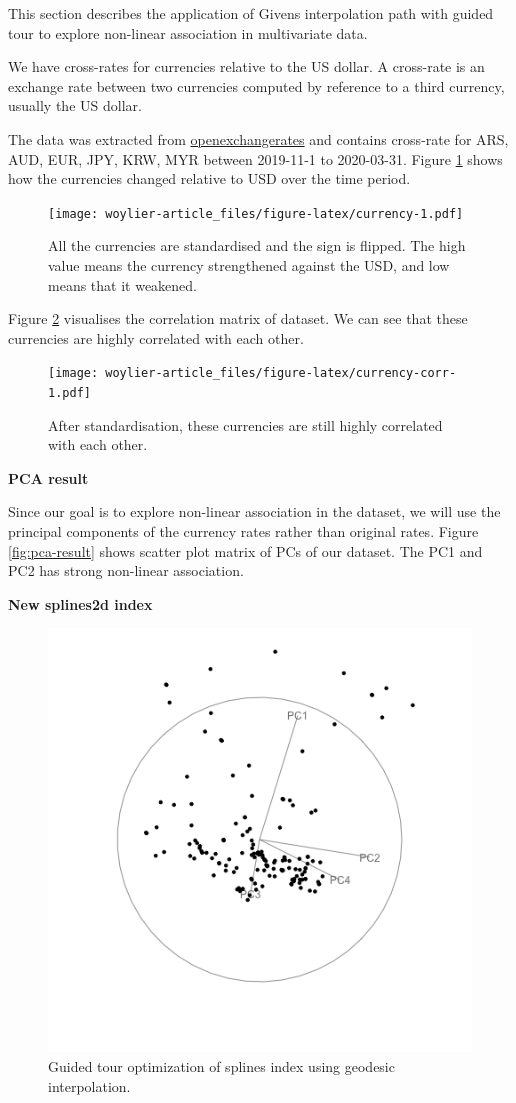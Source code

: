 This section describes the application of Givens interpolation path with guided tour to explore non-linear association in multivariate data.

We have cross-rates for currencies relative to the US dollar. A cross-rate is an exchange rate between two currencies computed by reference to a third currency, usually the US dollar.

The data was extracted from \href{https://openexchangerates.org}{openexchangerates} and contains cross-rate for ARS, AUD, EUR, JPY, KRW, MYR between 2019-11-1 to 2020-03-31. Figure \ref{fig:currency} shows how the currencies changed relative to USD over the time period.

\begin{figure}
\centering
\texttt{[image: woylier-article\_files/figure-latex/currency-1.pdf]}
\caption{\label{fig:currency}All the currencies are standardised and the sign is flipped. The high value means the currency strengthened against the USD, and low means that it weakened.}
\end{figure}

Figure \ref{fig:currency-corr} visualises the correlation matrix of dataset. We can see that these currencies are highly correlated with each other.

\begin{figure}
\centering
\texttt{[image: woylier-article\_files/figure-latex/currency-corr-1.pdf]}
\caption{\label{fig:currency-corr}After standardisation, these currencies are still highly correlated with each other.}
\end{figure}

\textbf{PCA result}

Since our goal is to explore non-linear association in the dataset, we will use the principal components of the currency rates rather than original rates. Figure \ref{fig:pca-result} shows scatter plot matrix of PCs of our dataset. The PC1 and PC2 has strong non-linear association.

\textbf{New splines2d index}

\begin{figure}

{\centering \includegraphics[width=0.5\linewidth]{guided_geo} 

}

\caption{Guided tour optimization of splines index using geodesic interpolation.}\label{fig:guided-geo-static}
\end{figure}

